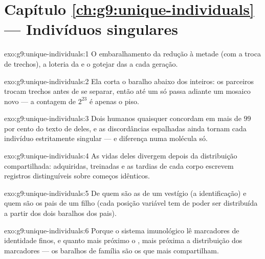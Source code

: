 \section*{Capítulo \ref{ch:g9:unique-individuals} --- Indivíduos singulares}

\begin{solution}{exo:g9:unique-individuals:1}
O embaralhamento da redução à metade (com a troca de
trechos), a loteria da  e o gotejar das  a
cada geração.
\end{solution}

\begin{solution}{exo:g9:unique-individuals:2}
Ela corta o baralho abaixo dos  inteiros: os
parceiros trocam trechos antes de se separar, então até um
 só passa adiante um mosaico novo --- a contagem de
$2^{23}$ é apenas o piso.
\end{solution}

\begin{solution}{exo:g9:unique-individuals:3}
Dois humanos quaisquer concordam em mais de $99$ por cento do
texto de  deles, e as discordâncias espalhadas ainda
tornam cada indivíduo estritamente singular ---  e
diferença numa molécula só.
\end{solution}

\begin{solution}{exo:g9:unique-individuals:4}
As vidas deles divergem depois da distribuição compartilhada:
 adquiridas,  treinadas e as 
tardias de cada corpo escrevem registros distinguíveis sobre
começos idênticos.
\end{solution}

\begin{solution}{exo:g9:unique-individuals:5}
De quem são as  de um vestígio (a identificação) e
quem são os pais de um filho (cada posição variável tem de
poder ser distribuída a partir dos dois baralhos dos pais).
\end{solution}

\begin{solution}{exo:g9:unique-individuals:6}
Porque o sistema imunológico lê marcadores de identidade
finos, e quanto mais próximo o , mais próxima a
distribuição dos marcadores --- os baralhos de família são os
que mais compartilham.
\end{solution}

